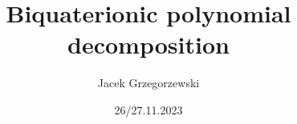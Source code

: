 \documentclass{beamer}
\title{Biquaterionic polynomial decomposition}
\author{Jacek Grzegorzewski}
\date{26/27.11.2023}
\begin{document}
%
%
%
%

\begin{frame}
    \titlepage
\end{frame}


\end{document}
